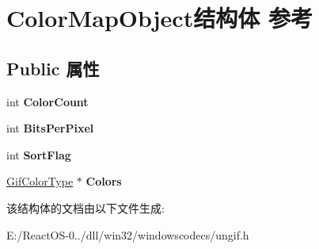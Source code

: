 \hypertarget{struct_color_map_object}{}\section{Color\+Map\+Object结构体 参考}
\label{struct_color_map_object}
\subsection*{Public 属性}
\begin{DoxyCompactItemize}
\item 
\mbox{\label{struct_color_map_object_afed65b44975de08797ffe4a179f08662}} 
int {\bfseries Color\+Count}
\item 
\mbox{\label{struct_color_map_object_af518af8186fff9ab079d22fd3b8a7462}} 
int {\bfseries Bits\+Per\+Pixel}
\item 
\mbox{\label{struct_color_map_object_a4171623662b9dbdae72a4863ac067f9d}} 
int {\bfseries Sort\+Flag}
\item 
\mbox{\label{struct_color_map_object_a30cd1175c56fa0bc9ed1761c2cc73e09}} 
\hyperlink{struct_gif_color_type}{Gif\+Color\+Type} $\ast$ {\bfseries Colors}
\end{DoxyCompactItemize}


该结构体的文档由以下文件生成\+:\begin{DoxyCompactItemize}
\item 
E\+:/\+React\+O\+S-\/0../dll/win32/windowscodecs/ungif.\+h\end{DoxyCompactItemize}
